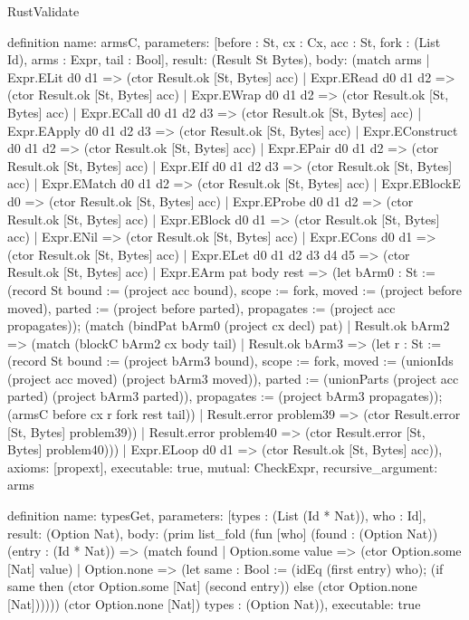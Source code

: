 \begin{lexlean}{RustValidate}
\begin{semanticmodule}
definition{
  name: armsC,
  parameters: [before : St, cx : Cx, acc : St, fork : (List Id), arms : Expr, tail : Bool],
  result: (Result St Bytes),
  body: (match arms
    | Expr.ELit d0 d1 => (ctor Result.ok [St, Bytes] acc)
    | Expr.ERead d0 d1 d2 => (ctor Result.ok [St, Bytes] acc)
    | Expr.EWrap d0 d1 d2 => (ctor Result.ok [St, Bytes] acc)
    | Expr.ECall d0 d1 d2 d3 => (ctor Result.ok [St, Bytes] acc)
    | Expr.EApply d0 d1 d2 d3 => (ctor Result.ok [St, Bytes] acc)
    | Expr.EConstruct d0 d1 d2 => (ctor Result.ok [St, Bytes] acc)
    | Expr.EPair d0 d1 d2 => (ctor Result.ok [St, Bytes] acc)
    | Expr.EIf d0 d1 d2 d3 => (ctor Result.ok [St, Bytes] acc)
    | Expr.EMatch d0 d1 d2 => (ctor Result.ok [St, Bytes] acc)
    | Expr.EBlockE d0 => (ctor Result.ok [St, Bytes] acc)
    | Expr.EProbe d0 d1 d2 => (ctor Result.ok [St, Bytes] acc)
    | Expr.EBlock d0 d1 => (ctor Result.ok [St, Bytes] acc)
    | Expr.ENil => (ctor Result.ok [St, Bytes] acc)
    | Expr.ECons d0 d1 => (ctor Result.ok [St, Bytes] acc)
    | Expr.ELet d0 d1 d2 d3 d4 d5 => (ctor Result.ok [St, Bytes] acc)
    | Expr.EArm pat body rest => (let bArm0 : St := (record St {bound := (project acc bound), scope := fork, moved := (project before moved), parted := (project before parted), propagates := (project acc propagates)}); (match (bindPat bArm0 (project cx decl) pat)
      | Result.ok bArm2 => (match (blockC bArm2 cx body tail)
        | Result.ok bArm3 => (let r : St := (record St {bound := (project bArm3 bound), scope := fork, moved := (unionIds (project acc moved) (project bArm3 moved)), parted := (unionParts (project acc parted) (project bArm3 parted)), propagates := (project bArm3 propagates)}); (armsC before cx r fork rest tail))
        | Result.error problem39 => (ctor Result.error [St, Bytes] problem39))
      | Result.error problem40 => (ctor Result.error [St, Bytes] problem40)))
    | Expr.ELoop d0 d1 => (ctor Result.ok [St, Bytes] acc)),
  axioms: [propext],
  executable: true,
  mutual: CheckExpr,
  recursive_argument: arms
}

definition{
  name: typesGet,
  parameters: [types : (List (Id * Nat)), who : Id],
  result: (Option Nat),
  body: (prim list_fold (fun [who] (found : (Option Nat)) (entry : (Id * Nat)) => (match found
    | Option.some value => (ctor Option.some [Nat] value)
    | Option.none => (let same : Bool := (idEq (first entry) who); (if same then (ctor Option.some [Nat] (second entry)) else (ctor Option.none [Nat]))))) (ctor Option.none [Nat]) types : (Option Nat)),
  executable: true
}


\end{semanticmodule}
\end{lexlean}
